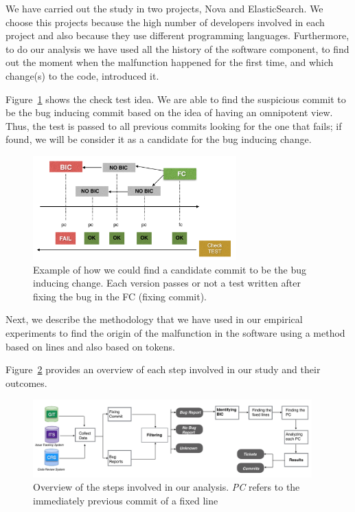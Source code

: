 \documentclass[a4paper]{article}
\begin{document}
We have carried out the study in two projects, Nova and ElasticSearch. We choose this projects because the high number of developers involved in each project and also because they use different programming languages. Furthermore, to do our analysis we have used all the history of the software component, to find out the moment when the malfunction happened for the first time, and which change(s) to the code, introduced it. 

Figure~\ref{fig:test} shows the check test idea. We are able to find the suspicious commit to be the bug inducing commit based on the idea of having an omnipotent view. Thus, the test is passed to all previous commits looking for the one that fails; if found, we will be consider it as a candidate for the bug inducing change.

\begin{figure}[ht]
\centering
\includegraphics[height=4cm]{testrecursive.png}
\caption{Example of how we could find a candidate commit to be the  bug inducing change. Each version passes or not a test written after fixing the bug in the FC (fixing commit).}
\label{fig:test}      
\end{figure}

Next, we describe the methodology that we have used in our empirical experiments to find the origin of the malfunction in the software using a method based on lines and also based on tokens. 

Figure~\ref{fig:diagram} provides an overview of each step involved in our study and their outcomes.

\begin{figure}[ht]
\centering
\includegraphics[height=3cm]{diagram.png}
\caption{Overview of the steps involved in our analysis. \emph{PC} refers to the immediately previous commit of a fixed line }
\label{fig:diagram}       %
\end{figure}
\end{document}
